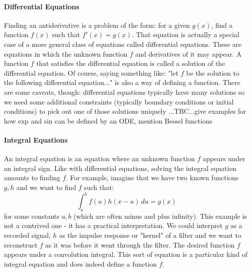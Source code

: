 \paragraph{Differential Equations}
Finding an antiderivative is a problem of the form: for a given $g(x)$, find a function $f(x)$ such that $f'(x) = g(x)$. That equation is actually a special case of a more general class of equations called differential equations. These are equations in which the unknown function $f$ and derivatives of it may appear. A function $f$ that satisfies the differential equation is called a solution of the differential equation. Of course, saying something like: "let $f$ be the solution to the following differential equation..." is also a way of defining a function. There are some caveats, though: differential equations typically have many solutions so we need some additional constraints (typically boundary conditions or initial conditions) to pick out one of those solutions uniquely ...TBC...give examples for how exp and sin can be defined by an ODE, mention Bessel functions


\paragraph{Integral Equations}
An integral equation is an equation where an unknown function $f$ appears under an integral sign. Like with differential equations, solving the integral equation amounts to finding $f$. For example, imagine that we have two known functions $g, h$ and we want to find $f$ such that:
\begin{equation}
 \int_a^b f(u) h(x-u) \, du = g(x)
\end{equation}
for some constants $a,b$ (which are often minus and plus infinity). This example is not a contrived one - it has a practical interpretation. We could interpret $g$ as a recorded signal, $h$ as the impulse response or "kernel" of a filter and we want to reconstruct $f$ as it was before it went through the filter. The desired function $f$ appears under a convolution integral. This sort of equation is a particular kind of integral equation and does indeed define a function $f$.





